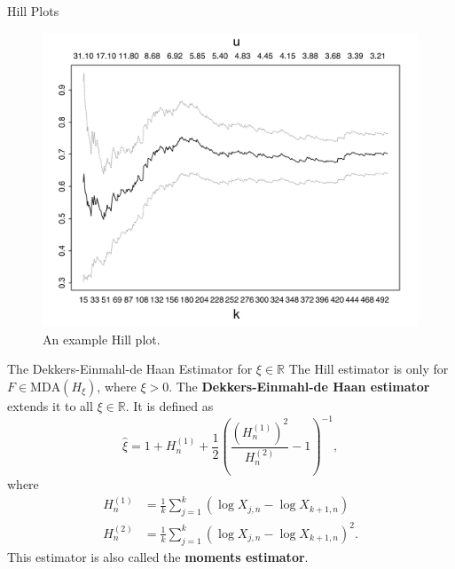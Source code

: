 \documentclass{beamer}
\newcommand{\MDA}{\text{MDA}}
\begin{document}
\begin{frame}{Hill Plots}
    \begin{figure}
        \centering
        \includegraphics[scale=0.35]{hill_plot.png}
        \caption{An example Hill plot.}
        \label{fig:hill_plot}
    \end{figure}
\end{frame}

\begin{frame}{The Dekkers-Einmahl-de Haan Estimator for $\xi \in \mathbb{R}$}
    The Hill estimator is only for $F \in \MDA(H_{\xi})$, where $\xi > 0$. The \textbf{Dekkers-Einmahl-de Haan estimator} extends it to all $\xi \in \mathbb{R}$. It is defined as
    \[
    \hat{\xi} = 1 + H_n^{(1)} + \frac{1}{2}\left(\frac{(H_n^{(1)})^2}{H_n^{(2)}} - 1\right)^{-1},
    \]
    where
    \begin{align*}
        H_n^{(1)} &= \frac{1}{k}\sum_{j = 1}^k (\log X_{j, n} - \log X_{k + 1, n}) \\
        H_n^{(2)} &= \frac{1}{k}\sum_{j = 1}^k (\log X_{j, n} - \log X_{k + 1, n})^2.
    \end{align*}
    This estimator is also called the \textbf{moments estimator}. 
\end{frame}
\end{document}
